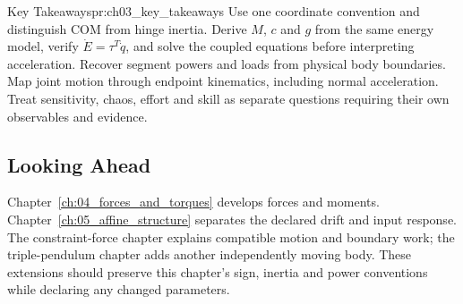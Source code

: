 \begin{principle}{Key Takeaways}{pr:ch03_key_takeaways}
Use one coordinate convention and distinguish COM from hinge inertia. Derive $M$, $c$ and $g$ from the same energy model, verify $\dot E=\tau^T\dot q$, and solve the coupled equations before interpreting acceleration. Recover segment powers and loads from physical body boundaries. Map joint motion through endpoint kinematics, including normal acceleration. Treat sensitivity, chaos, effort and skill as separate questions requiring their own observables and evidence.
\end{principle}

\subsection*{Looking Ahead}
Chapter~\ref{ch:04_forces_and_torques} develops forces and moments. Chapter~\ref{ch:05_affine_structure} separates the declared drift and input response. The constraint-force chapter explains compatible motion and boundary work; the triple-pendulum chapter adds another independently moving body. These extensions should preserve this chapter's sign, inertia and power conventions while declaring any changed parameters.


